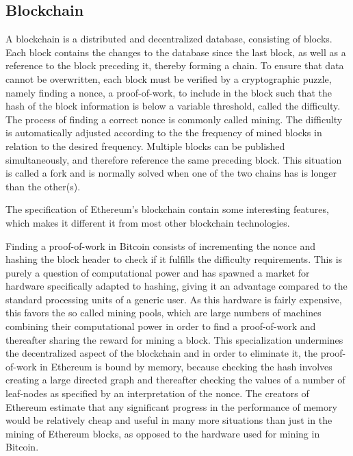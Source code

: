 \documentclass{article}
\begin{document}
		\subsection{Blockchain}
		\label{sec:blockchain}
		A blockchain is a distributed and decentralized database, consisting of blocks\cite{bitcoin-white-paper}. 
		Each block contains the changes to the database since the last block, as well as a reference to the block preceding it, thereby forming a chain.
		To ensure that data cannot be overwritten, each block must be verified by a cryptographic puzzle, namely finding a nonce, a proof-of-work, to include in the block such that the hash of the block information is below a variable threshold, called the difficulty\cite{bitcoin-white-paper}. 
		The process of finding a correct nonce is commonly called mining.
		The difficulty is automatically adjusted according to the the frequency of mined blocks in relation to the desired frequency.
		Multiple blocks can be published simultaneously, and therefore reference the same preceding block. This situation is called a fork and is normally solved when one of the two chains has is longer than the other(s).

		The specification of Ethereum's blockchain\cite{yellow-paper, ethereum-white-paper} contain some interesting features, which makes it different it from most other blockchain technologies.
		
		Finding a proof-of-work in Bitcoin consists of incrementing the nonce and hashing the block header to check if it fulfills the difficulty requirements. 
		This is purely a question of computational power and has spawned a market for hardware specifically adapted to hashing, giving it an advantage compared to the standard processing units of a generic user. 
		As this hardware is fairly expensive, this favors the so called mining pools, which are large numbers of machines combining their computational power in order to find a proof-of-work and thereafter sharing the reward for mining a block. 
		This specialization undermines the decentralized aspect of the blockchain and in order to eliminate it, the proof-of-work in Ethereum is bound by memory, because checking the hash involves creating a large directed graph and thereafter checking the values of a number of leaf-nodes as specified by an interpretation of the nonce. 
		The creators of Ethereum estimate that any significant progress in the performance of memory would be relatively cheap and useful in many more situations than just in the mining of Ethereum blocks, as opposed to the hardware used for mining in Bitcoin.
\end{document}
